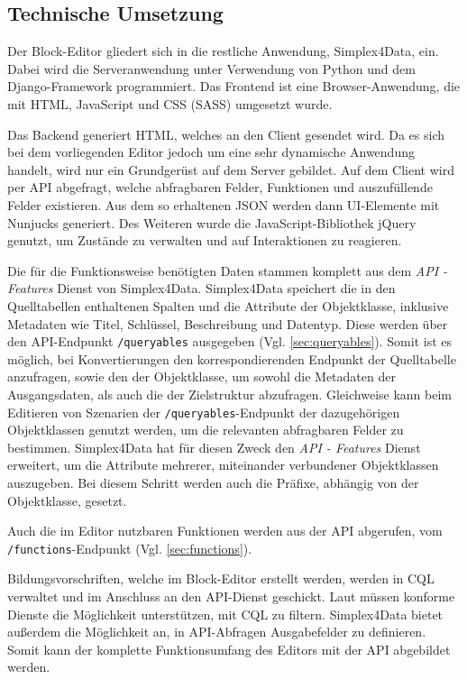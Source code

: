 \subsection{Technische Umsetzung}
Der Block-Editor gliedert sich in die restliche Anwendung, Simplex4Data, ein. Dabei wird die Serveranwendung unter Verwendung von Python und dem Django-Framework \parencite{djangosoftwarefoundationDjango} programmiert. Das Frontend ist eine Browser-Anwendung, die mit \ac{HTML}, JavaScript und \ac{CSS} (\ac{SASS}) umgesetzt wurde.

Das Backend generiert \ac{HTML}, welches an den Client gesendet wird. Da es sich bei dem vorliegenden Editor jedoch um eine sehr dynamische Anwendung handelt, wird nur ein Grundgerüst auf dem Server gebildet. Auf dem Client wird per \ac{API} abgefragt, welche abfragbaren Felder, Funktionen und auszufüllende Felder existieren. Aus dem so erhaltenen \ac{JSON} werden dann UI-Elemente mit Nunjucks \parencite{mozillaNunjucks} generiert. Des Weiteren wurde die JavaScript-Bibliothek jQuery \parencite{openjsfoundationJQuery} genutzt, um Zustände zu verwalten und auf Interaktionen zu reagieren.

Die für die Funktionsweise benötigten Daten stammen komplett aus dem \textit{API - Features} Dienst \parencite{ogcAPI} von Simplex4Data. Simplex4Data speichert die in den Quelltabellen enthaltenen Spalten und die Attribute der Objektklasse, inklusive Metadaten wie Titel, Schlüssel, Beschreibung und Datentyp. Diese werden über den \ac{API}-Endpunkt \texttt{/queryables} ausgegeben (Vgl. \ref{sec:queryables}). Somit ist es möglich, bei Konvertierungen den korrespondierenden Endpunkt der Quelltabelle anzufragen, sowie den der Objektklasse, um sowohl die Metadaten der Ausgangsdaten, als auch die der Zielstruktur abzufragen. Gleichweise kann beim Editieren von Szenarien der \texttt{/queryables}-Endpunkt der dazugehörigen Objektklassen genutzt werden, um die relevanten abfragbaren Felder zu bestimmen. Simplex4Data hat für diesen Zweck den \textit{API - Features} Dienst erweitert, um die Attribute mehrerer, miteinander verbundener Objektklassen auszugeben. Bei diesem Schritt werden auch die Präfixe, abhängig von der Objektklasse, gesetzt.

Auch die im Editor nutzbaren Funktionen werden aus der \ac{API} abgerufen, vom \texttt{/functions}-Endpunkt (Vgl. \ref{sec:functions}).

Bildungsvorschriften, welche im Block-Editor erstellt werden, werden in \ac{CQL} verwaltet und im Anschluss an den \ac{API}-Dienst geschickt. Laut  müssen konforme Dienste die Möglichkeit unterstützen, mit \ac{CQL} zu filtern. Simplex4Data bietet außerdem die Möglichkeit an, in \ac{API}-Abfragen Ausgabefelder zu definieren. Somit kann der komplette Funktionsumfang des Editors mit der \ac{API} abgebildet werden.
